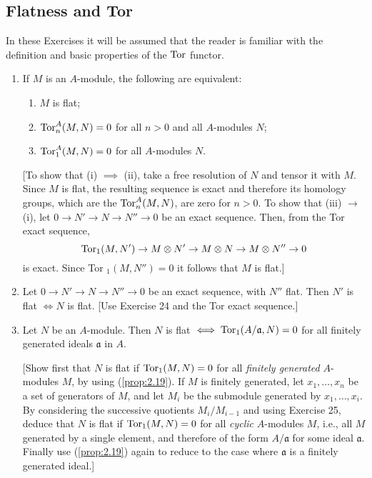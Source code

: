 \documentclass{standalone}
\theoremstyle{definition}
\theoremstyle{remark}
\begin{document}
\subsection*{Flatness and Tor}
In these Exercises it will be assumed that the reader is familiar with the
definition and basic properties of the $\operatorname{Tor}$ functor.
\begin{enumerate}[resume*=exc2]
  \item If $M$ is an $A$-module, the following are equivalent:
\begin{enumerate}
\item $M$ is flat;
\item $\operatorname{Tor}_{n}^{A}(M, N)=0$ for all $n>0$ and all $A$-modules $N$;
\item $\operatorname{Tor}_{1}^{A}(M, N)=0$ for all $A$-modules $N$.
\end{enumerate}
[To show that (i) $\implies$ (ii), take a free resolution of $N$ and tensor it with
$M$. Since $M$ is flat, the resulting sequence is exact and therefore its
homology groups, which are the $\operatorname{Tor}_{n}^{A}(M, N)$, are
zero for $n>0$. To show that (iii) $\to$ (i), let $0 \to N' \to N \to N'' \to 0$
be an exact sequence. Then, from the Tor exact sequence,
\[
  \operatorname{Tor}_{1}(M, N') \to M \otimes N' \to M \otimes N \to M \otimes N'' \to 0
\]
is exact. Since Tor $_{1}(M, N'')=0$ it follows that $M$ is flat.]
  \item Let $0 \to N' \to N \to N'' \to 0$ be an exact sequence, with $N''$
        flat. Then $N'$ is flat $\iff N$ is flat. [Use Exercise 24
        and the Tor exact sequence.]
  \item Let $N$ be an $A$-module. Then $N$ is
        flat $\iff\operatorname{Tor}_{1}(A / \mathfrak{a}, N)=0$ for all finitely
        generated ideals $\mathfrak{a}$ in $A$.

[Show first that $N$ is flat if $\operatorname{Tor}_{1}(M, N)=0$ for all
{\itshape finitely generated} $A$-modules $M$, by using
(\ref{prop:2.19}). If $M$ is finitely 
generated, let $x_{1}, \ldots, x_{n}$ be a set of generators of $M$, and let
$M_{i}$ be the submodule generated by $x_{1}, \ldots, x_{i}$. By considering the
successive quotients $M_{i} / M_{i-1}$ and using Exercise
25, deduce that $N$ is flat if $\operatorname{Tor}_{1}(M, N)=0$ for all {\itshape cyclic}
$A$-modules $M$, i.e., all $M$ generated by a single element, and therefore of
the form $A / \mathfrak{a}$ for some ideal $\mathfrak{a}$. Finally use
(\ref{prop:2.19}) again to reduce to the case where $\mathfrak{a}$ is a finitely
generated ideal.]


\end{enumerate}
\end{document}
